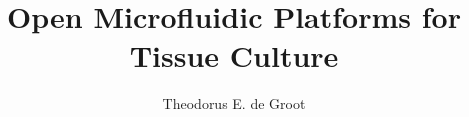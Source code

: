 \documentclass[11pt]{report}
\begin{document}
\title{Open Microfluidic Platforms for Tissue Culture}
\author{Theodorus E. de Groot}



\beforepreface
{}
 



 
% 
\listoffigures
\listoftables

\afterpreface










\appendix       %
% 
% 
% 
% 
% 
% 
% 


\begin{singlespacing}
% 
\end{singlespacing}
\end{document}
